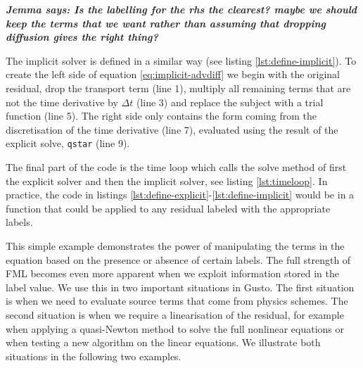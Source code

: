 \documentclass[journal abbreviation, manuscript]{copernicus}
\newcommand{\JScomment}[1]{\textit{\textbf{Jemma says: #1}}}
\begin{document}
\JScomment{Is the
  labelling for the rhs the clearest? maybe we should keep the terms
  that we want rather than assuming that dropping diffusion gives the
  right thing?}



The implicit solver is defined in a similar way (see listing
\ref{lst:define-implicit}). To create the left side of equation
\ref{eq:implicit-advdiff} we begin with the original residual, drop
the transport term (line 1), multiply all remaining terms that are not
the time derivative by $\Delta t$ (line 3) and replace the subject
with a trial function (line 5). The right side only contains the form
coming from the discretisation of the time derivative (line 7),
evaluated using the result of the explicit solve, \texttt{qstar} (line
9).



The final part of the code is the time loop which calls the solve
method of first the explicit solver and then the implicit solver, see
listing \ref{lst:timeloop}. In practice, the code in listings
\ref{lst:define-explicit}-\ref{lst:define-implicit} would be in a
function that could be applied to any residual labeled with the
appropriate labels.



This simple example demonstrates the power of manipulating the terms
in the equation based on the presence or absence of certain
labels. The full strength of FML becomes even more apparent when we
exploit information stored in the label value. We use this in two
important situations in Gusto. The first situation is when we need to
evaluate source terms that come from physics schemes. The second
situation is when we require a linearisation of the residual, for
example when applying a quasi-Newton method to solve the full
nonlinear equations or when testing a new algorithm on the linear
equations. We illustrate both situations in the following two
examples.
\end{document}
